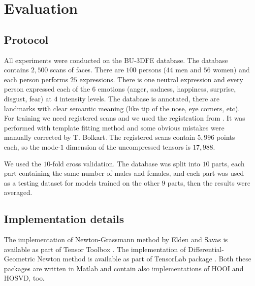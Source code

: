 \chapter{Evaluation}
\label{chap_eval}

\section{Protocol}

All experiments were conducted on the BU-3DFE database. The database contains $2,500$ scans of faces. There are $100$
persons ($44$ men and $56$ women) and each person performs $25$ expressions.
There is one neutral expression and every person expressed each of the $6$ emotions (anger, sadness,
happiness, surprise, disgust, fear) at $4$ intensity levels. The database is annotated, there are landmarks
with clear semantic meaning (like tip of the nose, eye corners, etc).
For training we need registered scans and we used the registration 
from \cite{Salazar}. It was performed with template fitting method
and some obvious mistakes were manually corrected by T. Bolkart.
The registered scans contain $5,996$ points each, so the mode-$1$ dimension
of the  uncompressed tensors is $17,988$.

We used the {$10$-fold} cross validation. 
The database was split into $10$ parts, each part containing the same number of males and females, and
each part was used as a testing dataset for models trained on the other $9$ parts, then the results
were averaged.


\section{Implementation details}


The implementation of Newton-Grassmann method
by Elden and Savas is available as part of Tensor Toolbox \cite{tensor_toolbox}.
The implementation of Differential-Geometric Newton method
is available as part of TensorLab package \cite{tensor_lab}.
Both these packages are written in Matlab and contain
also implementations of HOOI and HOSVD, too.

